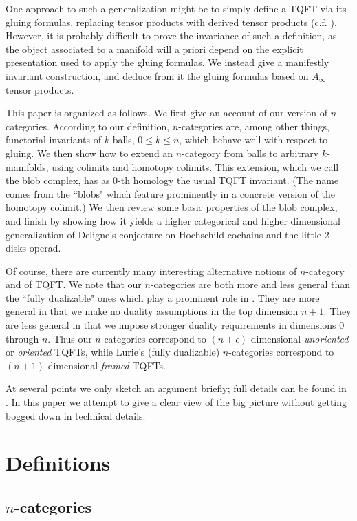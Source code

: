 \documentclass{pnastwo}
\begin{document}
\begin{article}
One approach to such a generalization might be to simply define a
TQFT via its gluing formulas, replacing tensor products with
derived tensor products (c.f. \cite{1011.1958}).
However, it is probably difficult to prove
the invariance of such a definition, as the object associated to a manifold
will a priori depend on the explicit presentation used to apply the gluing formulas.
We instead give a manifestly invariant construction, and
deduce from it the gluing formulas based on $A_\infty$ tensor products.

This paper is organized as follows.
We first give an account of our version of $n$-categories.
According to our definition, $n$-categories are, among other things,
functorial invariants of $k$-balls, $0\le k \le n$, which behave well with respect to gluing.
We then show how to extend an $n$-category from balls to arbitrary $k$-manifolds,
using colimits and homotopy colimits.
This extension, which we call the blob complex, has as $0$-th homology the usual TQFT invariant.
(The name comes from the ``blobs" which feature prominently
in a concrete version of the homotopy colimit.)
We then review some basic properties of the blob complex, and finish by showing how it
yields a higher categorical and higher dimensional generalization of Deligne's
conjecture on Hochschild cochains and the little 2-disks operad.

Of course, there are currently many interesting alternative notions of $n$-category and of TQFT.
We note that our $n$-categories are both more and less general
than the ``fully dualizable" ones which play a prominent role in \cite{0905.0465}.
They are more general in that we make no duality assumptions in the top dimension $n{+}1$.
They are less general in that we impose stronger duality requirements in dimensions 0 through $n$.
Thus our $n$-categories correspond to $(n{+}\epsilon)$-dimensional {\it unoriented} or {\it oriented} TQFTs, while
Lurie's (fully dualizable) $n$-categories correspond to $(n{+}1)$-dimensional {\it framed} TQFTs.

At several points we only sketch an argument briefly; full details can be found in \cite{1009.5025}. 
In this paper we attempt to give a clear view of the big picture without getting 
bogged down in technical details.


\section{Definitions}
\subsection{$n$-categories} \mbox{}


\end{article}
\end{document}
